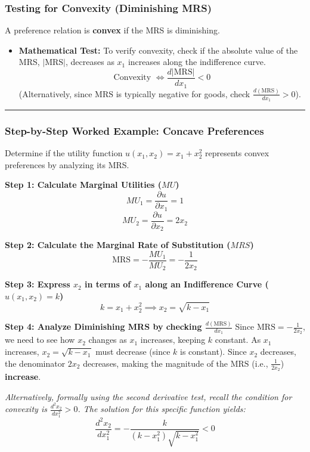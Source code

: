 \documentclass{article}
\begin{document}
\subsubsection*{Testing for Convexity (Diminishing MRS)}

A preference relation is \textbf{convex} if the MRS is diminishing.

\begin{itemize}
    \item \textbf{Mathematical Test:} To verify convexity, check if the absolute value of the MRS, $|\text{MRS}|$, decreases as $x_1$ increases along the indifference curve. \[\text{Convexity } \iff \frac{d|\text{MRS}|}{dx_1} < 0\] (Alternatively, since $\text{MRS}$ is typically negative for goods, check $\frac{d(\text{MRS})}{dx_1} > 0$).
\end{itemize}

\vspace{1em}\hrule\vspace{1em}

\subsubsection*{Step-by-Step Worked Example: Concave Preferences}

Determine if the utility function $u(x_1, x_2) = x_1 + x_2^2$ represents convex preferences by analyzing its MRS.

\textbf{Step 1: Calculate Marginal Utilities ($MU$)} \[MU_1 = \frac{\partial u}{\partial x_1} = 1\] \[MU_2 = \frac{\partial u}{\partial x_2} = 2x_2\]

\textbf{Step 2: Calculate the Marginal Rate of Substitution ($MRS$)} \[\text{MRS} = -\frac{MU_1}{MU_2} = -\frac{1}{2x_2}\]

\textbf{Step 3: Express $x_2$ in terms of $x_1$ along an Indifference Curve ($u(x_1, x_2) = k$)} \[k = x_1 + x_2^2 \implies x_2 = \sqrt{k - x_1}\]

\textbf{Step 4: Analyze Diminishing MRS by checking $\frac{d(\text{MRS})}{dx_1}$}
Since $\text{MRS} = -\frac{1}{2x_2}$, we need to see how $x_2$ changes as $x_1$ increases, keeping $k$ constant. As $x_1$ increases, $x_2 = \sqrt{k - x_1}$ must decrease (since $k$ is constant). Since $x_2$ decreases, the denominator $2x_2$ decreases, making the magnitude of the $\text{MRS}$ (i.e., $\frac{1}{2x_2}$) \textbf{increase}.

\textit{Alternatively, formally using the second derivative test, recall the condition for convexity is $\frac{d^2 x_2}{dx_1^2} > 0$. The solution for this specific function yields:} \[\frac{d^2 x_2}{dx_1^2} = -\frac{k}{(k - x_1^2) \sqrt{k - x_1^2}} < 0\]
\end{document}
